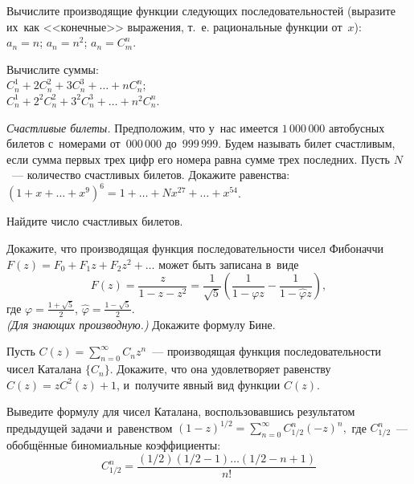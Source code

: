 \begin{problems}

\item
Вычислите производящие функции следующих последовательностей
(выразите их~как <<конечные>> выражения, т.~е. рациональные функции от~$x$):
\\[0.2ex]
\sbp $a_n = n$;
\qquad
\sbp $a_n = n^2$;
\qquad
\sbp $a_n = C_m^n$.

\item
Вычислите суммы:
\\[0.2ex]
\sbp $C_n^1 + 2 C_n^2 + 3 C_n^3 + \ldots + n C_n^n$;
\\[0.3ex]
\sbp $C_n^1 + 2^2 C_n^2 + 3^2 C_n^3 + \ldots + n^2 C_n^n$.

\item\emph{Счастливые билеты.}
Предположим, что у~нас имеется $1\,000\,000$ автобусных билетов с~номерами
от~$000\,000$ до~$999\,999$.
Будем называть билет счастливым, если сумма первых трех цифр его номера равна
сумме трех последних.
Пусть $N$~--- количество счастливых билетов.
Докажите равенства:
\\[0.2ex]
\sbp
\(
    (1 + x + \ldots + x^9)^6
=
    1 + \ldots + N x^{27} + \ldots + x^{54}
\).

\item
Найдите число счастливых билетов.

\item
Докажите, что производящая функция последовательности чисел Фибоначчи
$F(z) = F_0 + F_1 z + F_2 z^2 + \ldots$ может быть записана в~виде
\[
    F(z)
=
    \frac{z}{1 - z - z^2}
=
    \frac{1}{\sqrt{5}}
    \left(
        \frac{1}{1 - \varphi z} - \frac{1}{1 - \widehat{\varphi} z}
    \right)
,\]
где
$\varphi = \frac{1 + \sqrt{5}}{2}$,
$\widehat{\varphi} = \frac{1 - \sqrt{5}}{2}$.
\\
\emph{(Для знающих производную.)} Докажите формулу Бине.

\item
Пусть
\(
    C(z)
=
    \sum\limits_{n = 0}^{\infty}
        C_n z^n
\)~--- производящая функция последовательности чисел Каталана $\{C_n\}$.
Докажите, что она удовлетворяет равенству $C(z) = z C^2(z) + 1$, и~получите
явный вид функции $C(z)$.

\item
Выведите формулу для чисел Каталана,
воспользовавшись результатом предыдущей задачи и~равенством
\(
    (1 - z)^{1/2}
=
    \sum\limits_{n=0}^{\infty}
        C_{1/2}^n (-z)^n
,\)
где $C_{1/2}^n$~--- обобщённые биномиальные коэффициенты:
\[
    C_{1/2}^n
=
    \frac{
        (1/2) (1/2 - 1) \ldots (1/2 - n + 1 )
    }{n!}
\]

\end{problems}

